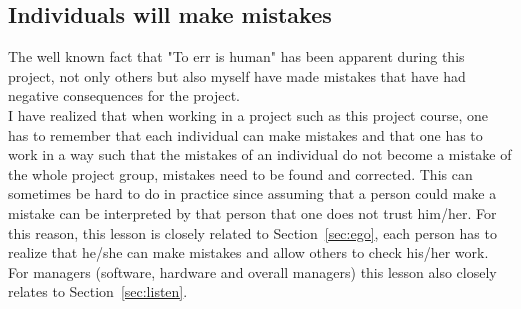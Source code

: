 \subsection{Individuals will make mistakes}
The well known fact that "To err is human" has been apparent during this project, not only others but also myself have made mistakes that have had negative consequences for the project. \\ %
I have realized that when working in a project such as this project course, one has to remember that each individual can make mistakes and that one has to work in a way such that the mistakes of an individual do not become a mistake of the whole project group, mistakes need to be found and corrected. %
This can sometimes be hard to do in practice since assuming that a person could make a mistake can be interpreted by that person that one does not trust him/her. For this reason, this lesson is closely related to Section~\ref{sec:ego}, each person has to realize that he/she can make mistakes and allow others to check his/her work. \\
For managers (software, hardware and overall managers) this lesson also closely relates to Section~\ref{sec:listen}.


